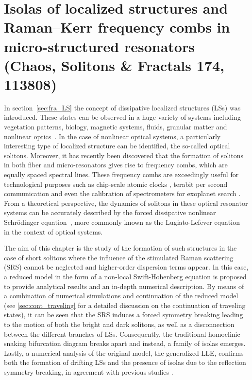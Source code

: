 \chapter{Isolas of localized structures and Raman–Kerr frequency combs in micro-structured resonators (Chaos, Solitons \& Fractals 174, 113808)}

In section~\ref{sec:fra_LS} the concept of dissipative 
localized structures (LSs) was introduced. These states can be observed in a huge variety
of systems including vegetation patterns, biology, magnetic systems, fluids,
granular matter and nonlinear 
optics~\cite{tlidi2014localized,heimburg2005soliton,descalzi2011localized,purwins2010dissipative,ankiewicz2008dissipative,knobloch2015spatial}. 
In the case of nonlinear optical systems,
a particularly interesting type of localized structure can be identified,
the so-called optical solitons. Moreover, it has recently been discovered that the formation of solitons
in both fiber and micro-resonators gives rise to frequency combs, which are equally
spaced spectral lines. These frequency combs are exceedingly useful
for technological purposes such as chip-scale atomic clocks \cite{Jost2015clock}, terabit
per second communication \cite{marin2017microresonator} and even the calibration of spectrometers
for exoplanet search \cite{suh2019searching}. From a theoretical perspective, the dynamics
of solitons in these optical resonator systems can be accurately described 
by the forced dissipative nonlinear Schrödinger
equation~\cite{morales1974ponderomotive,nozaki1984solitons,kaup1978theory,ferre2017localized},
more commonly known as the Lugiato-Lefever equation~\cite{lugiatolefever1987} in the context
of optical systems.

The aim of this chapter is the study of the formation of such structures in the
case of short solitons where the influence of the stimulated Raman scattering (SRS)
cannot be neglected and higher-order dispersion terms appear. In this case, a reduced model
in the form of a non-local Swift-Hohenberg equation is proposed to provide 
analytical results and an in-depth numerical description. By means of a combination of
numerical simulations and
continuation of the reduced model (see \ref{sec:cont_traveling} for a detailed discussion on the
continuation of traveling states), it can be seen that the SRS induces a forced symmetry
breaking leading to the motion of both the bright and dark solitons, as well as a disconnection between 
the different branches of LSs. Consequently, the traditional homoclinic snaking bifurcation diagram breaks
apart and instead, a family of isolas emerges. Lastly, a numerical analysis of the
original model, the generalized LLE, confirms both the formation of drifting LSs and
the presence of isolas due to the reflection symmetry breaking, in agreement with previous studies \cite{burke2009swift,parra2014third}.

